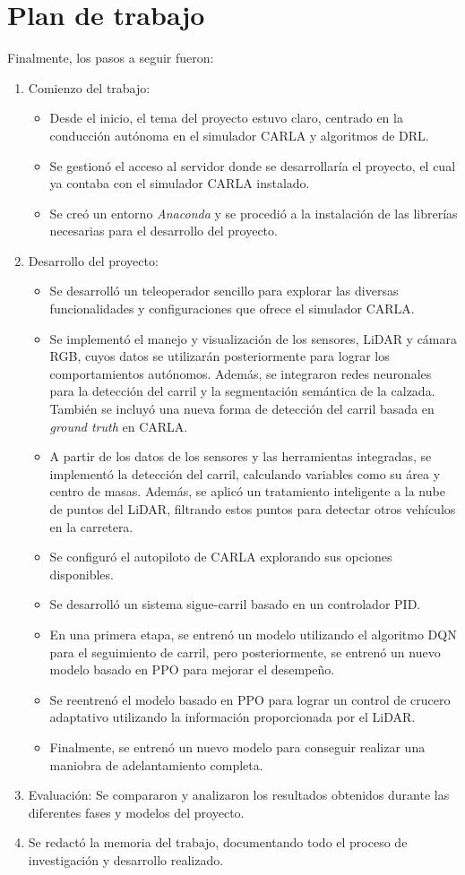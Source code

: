 \section{Plan de trabajo}
\label{sec:plantrabajo}

Finalmente, los pasos a seguir fueron:

\begin{enumerate}
\item Comienzo del trabajo:
\begin{itemize}
\item Desde el inicio, el tema del proyecto estuvo claro, centrado en la conducción autónoma en el simulador CARLA y algoritmos de \ac{DRL}.
\item Se gestionó el acceso al servidor donde se desarrollaría el proyecto, el cual ya contaba con el simulador CARLA instalado. 
\item Se creó un entorno \textit{Anaconda} y se procedió a la instalación de las librerías necesarias para el desarrollo del proyecto.
\end{itemize}

\item Desarrollo del proyecto:
\begin{itemize}
\item Se desarrolló un teleoperador sencillo para explorar las diversas funcionalidades y configuraciones que ofrece el simulador CARLA.
\item Se implementó el manejo y visualización de los sensores, \ac{LiDAR} y cámara RGB, cuyos datos se utilizarán posteriormente para lograr los comportamientos autónomos. Además, se integraron redes neuronales para la detección del carril y la segmentación semántica de la calzada. También se incluyó una nueva forma de detección del carril basada en \textit{ground truth} en CARLA. 
\item A partir de los datos de los sensores y las herramientas integradas, se implementó la detección del carril, calculando variables como su área y centro de masas. Además, se aplicó un tratamiento inteligente a la nube de puntos del \ac{LiDAR}, filtrando estos puntos para detectar otros vehículos en la carretera.
\item Se configuró el autopiloto de CARLA explorando sus opciones disponibles.
\item Se desarrolló un sistema sigue-carril basado en un controlador \ac{PID}.
\item En una primera etapa, se entrenó un modelo utilizando el algoritmo \ac{DQN} para el seguimiento de carril, pero posteriormente, se entrenó un nuevo modelo basado en \ac{PPO} para mejorar el desempeño.
\item Se reentrenó el modelo basado en \ac{PPO} para lograr un control de crucero adaptativo utilizando la información proporcionada por el \ac{LiDAR}.
\item Finalmente, se entrenó un nuevo modelo para conseguir realizar una maniobra de adelantamiento completa.
\end{itemize}

\item Evaluación: Se compararon y analizaron los resultados obtenidos durante las diferentes fases y modelos del proyecto.
\item Se redactó la memoria del trabajo, documentando todo el proceso de investigación y desarrollo realizado.
\end{enumerate}

